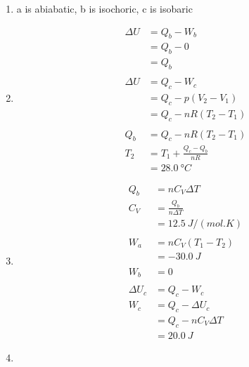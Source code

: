 \documentclass{article}
\begin{document}
\begin{enumerate}
  \item a is abiabatic, b is isochoric, c is isobaric

  \item

        \begin{align*}
          \Delta U & = Q_b - W_b                   \\
                   & = Q_b - 0                     \\
                   & = Q_b                         \\ \\
          \Delta U & = Q_c - W_c                   \\
                   & = Q_c - p (V_2 - V_1)         \\
                   & = Q_c - n R (T_2 - T_1)       \\ \\
          Q_b      & = Q_c - n R (T_2 - T_1)       \\
          T_2      & = T_1 + \frac{Q_c - Q_b}{n R} \\
                   & = \qty{28.0}{\degree C}
        \end{align*}

  \item

        \begin{align*}
          Q_b        & = n C_V \Delta T         \\
          C_V        & = \frac{Q_b}{n \Delta T} \\
                     & = \qty{12.5}{J/(mol.K)}  \\ \\
          W_a        & = n C_V (T_1 - T_2)      \\
                     & = \qty{-30.0}{J}         \\ \\
          W_b        & = 0                      \\ \\
          \Delta U_c & = Q_c - W_c              \\
          W_c        & = Q_c - \Delta U_c       \\
                     & = Q_c - n C_V \Delta T   \\
                     & = \qty{20.0}{J}
        \end{align*}

  \item


\end{enumerate}
\end{document}
